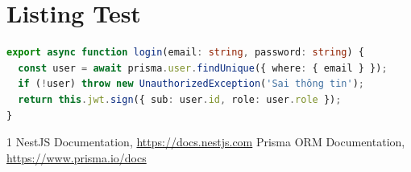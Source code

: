 \documentclass[conference,a4paper]{IEEEtran}
\begin{document}
\section{Listing Test}
\begin{lstlisting}[language=TypeScript,basicstyle=\ttfamily\small,caption={Code sample}]
export async function login(email: string, password: string) {
  const user = await prisma.user.findUnique({ where: { email } });
  if (!user) throw new UnauthorizedException('Sai thông tin');
  return this.jwt.sign({ sub: user.id, role: user.role });
}
\end{lstlisting}

\begin{thebibliography}{1}
 NestJS Documentation, \url{https://docs.nestjs.com}
 Prisma ORM Documentation, \url{https://www.prisma.io/docs}
\end{thebibliography}
\end{document}
